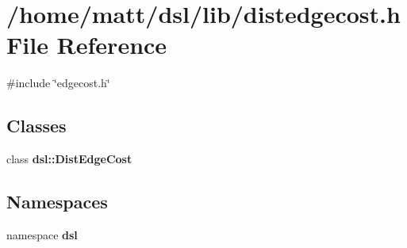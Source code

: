 \section{/home/matt/dsl/lib/distedgecost.h \-File \-Reference}
\label{distedgecost_8h}
{\ttfamily \#include \char`\"{}edgecost.\-h\char`\"{}}\*
\subsection*{\-Classes}
\begin{DoxyCompactItemize}
\item 
class {\bf dsl\-::\-Dist\-Edge\-Cost}
\end{DoxyCompactItemize}
\subsection*{\-Namespaces}
\begin{DoxyCompactItemize}
\item 
namespace {\bf dsl}
\end{DoxyCompactItemize}
